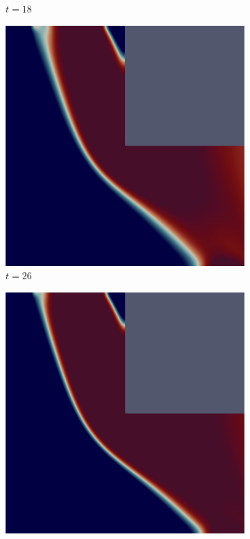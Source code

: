\begin{figure}[H]
\begin{subfigure}{.4\textwidth}
        \caption{$t = 18$}
    \end{subfigure}
    \begin{subfigure}{.4\textwidth}
        \includegraphics[width=\textwidth]{imgs/LShapeSource/fifth.png}
        \caption{$t = 26$}
    \end{subfigure}
    \begin{subfigure}{.4\textwidth}
        \includegraphics[width=\textwidth]{imgs/LShapeSource/sixth.png}

\end{subfigure}
\end{figure}
